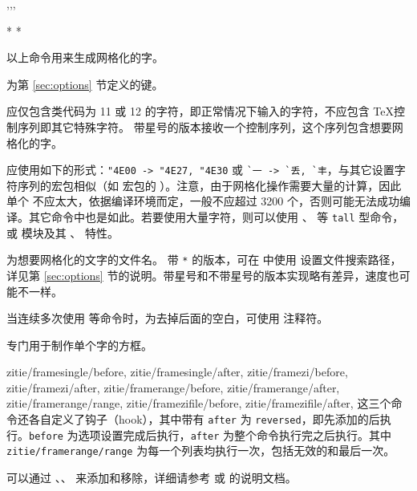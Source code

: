 \documentclass{ctxdoc}
\begin{document}
\begin{function}{\framesingle,\framezi,\framerange,\framezifile}
  \begin{syntax}
      
     *  
      
     *  
  \end{syntax}
  以上命令用来生成网格化的字。
  
   为第 \ref{sec:options} 节定义的键。

   应仅包含类代码为 11 或 12 的字符，即正常情况下输入的字符，不应包含 \TeX 控制序列即其它特殊字符。 带星号的版本接收一个控制序列，这个序列包含想要网格化的字。

   应使用如下的形式：\verb|"4E00 -> "4E27, "4E30| 或 \verb|`一 -> `丢, `丰|，与其它设置字符序列的宏包相似（如  宏包的 ）。注意，由于网格化操作需要大量的计算，因此单个  不应太大，依据编译环境而定，一般不应超过 3200 个，否则可能无法成功编译。其它命令中也是如此。若要使用大量字符，则可以使用 、 等 \verb|tall| 型命令，或  模块及其 、 特性。

   为想要网格化的文字的文件名。 带 \verb|*| 的版本，可在  中使用  设置文件搜索路径，详见第 \ref{sec:options} 节的说明。带星号和不带星号的版本实现略有差异，速度也可能不一样。

  当连续多次使用  等命令时，为去掉后面的空白，可使用 \opt{\%} 注释符。

   专门用于制作单个字的方框。
\end{function}

\begin{function}{
  zitie/framesingle/before, zitie/framesingle/after,
  zitie/framezi/before, zitie/framezi/after,
  zitie/framerange/before, zitie/framerange/after,
  zitie/framerange/range,
  zitie/framezifile/before, zitie/framezifile/after,
}
  这三个命令还各自定义了钩子（hook），其中带有 \verb|after| 为 \verb|reversed|，即先添加的后执行。\verb|before| 为选项设置完成后执行，\verb|after| 为整个命令执行完之后执行。其中 \verb|zitie/framerange/range| 为每一个列表均执行一次，包括无效的和最后一次。

  可以通过 、、 来添加和移除，详细请参考 \cite{pdf-source2e} 或 \cite{pkg-lthooks} 的说明文档。
\end{function}
\end{document}
